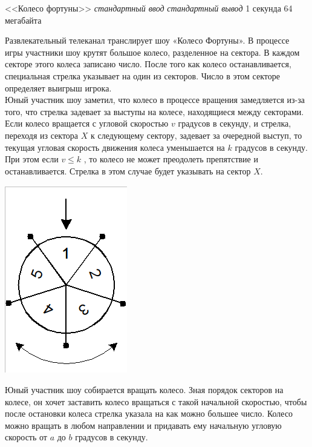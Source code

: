 \begin{problem}%
{<<Колесо фортуны>>}%
{\textsl{стандартный ввод}}%
{\textsl{стандартный вывод}}%
{1 секунда}%
{64 мегабайта}{}

Развлекательный телеканал транслирует шоу «Колесо Фортуны». В процессе игры участники шоу крутят большое колесо, разделенное на сектора. В каждом секторе этого колеса записано число. После того как колесо останавливается, специальная стрелка указывает на один из секторов. Число в этом секторе определяет выигрыш игрока.\\

Юный участник шоу заметил, что колесо в процессе вращения замедляется из-за того, что стрелка задевает за выступы на колесе, находящиеся между секторами. Если колесо вращается с угловой скоростью $v$ градусов в секунду, и стрелка, переходя из сектора $X$ к следующему сектору, задевает за очередной выступ, то текущая угловая скорость движения колеса уменьшается на $k$ градусов в секунду. При этом если $v \le k$ , то колесо не может преодолеть препятствие и останавливается. Стрелка в этом случае будет указывать на сектор $X$.\\

\begin{center}
\includegraphics[scale=0.5]{images/1.png}
\end{center}

Юный участник шоу собирается вращать колесо. Зная порядок секторов на колесе, он хочет заставить колесо вращаться с такой начальной скоростью, чтобы после остановки колеса стрелка указала на как можно большее число. Колесо можно вращать в любом направлении и придавать ему начальную угловую скорость от $a$ до $b$ градусов в секунду.\\


\end{problem}
